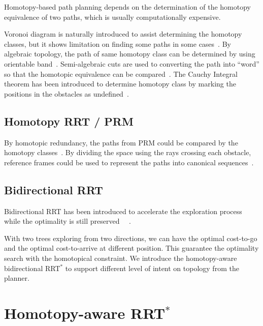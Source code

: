 \documentclass[letterpaper, 10 pt, conference]{ieeeconf}
\begin{document}
Homotopy-based path planning depends on the determination of the homotopy equivalence of two paths, which is usually computationally expensive.

Voronoi diagram is naturally introduced to assist determining the homotopy classes, but it shows limitation on finding some paths in some cases~\cite{banerjee2013framework}.
By algebraic topology, the path of same homotopy class can be determined by using orientable band~\cite{Hershberger199463}.
Semi-algebraic cuts are used to converting the path into ``word'' so that the homotopic equivalence can be compared~\cite{Grigoriev:1998:PAS:281508.281528}.
The Cauchy Integral theorem has been introduced to determine homotopy class by marking the positions in the obstacles as undefined~\cite{AAAI101920}.

\subsection{Homotopy RRT / PRM}

By homotopic redundancy, the paths from PRM could be compared by the homotopy classes~\cite{1041613}.
By dividing the space using the rays crossing each obstacle, reference frames could be used to represent the paths into canonical sequences~\cite{Hernandez201544}.

\subsection{Bidirectional RRT}

Bidirectional RRT has been introduced to accelerate the exploration process while the optimality is still preserved~
\cite{Jordan.Perez.ea:CSAIL13}~\cite{starek2014bidirectional}.

With two trees exploring from two directions, we can have the optimal cost-to-go and the optimal cost-to-arrive at different position.
This guarantee the optimality search with the homotopical constraint.
We introduce the homotopy-aware bidirectional RRT$^{*}$ to support different level of intent on topology from the planner.

\section{Homotopy-aware RRT$^{*}$}
\label{sec:algorithm}
\end{document}
